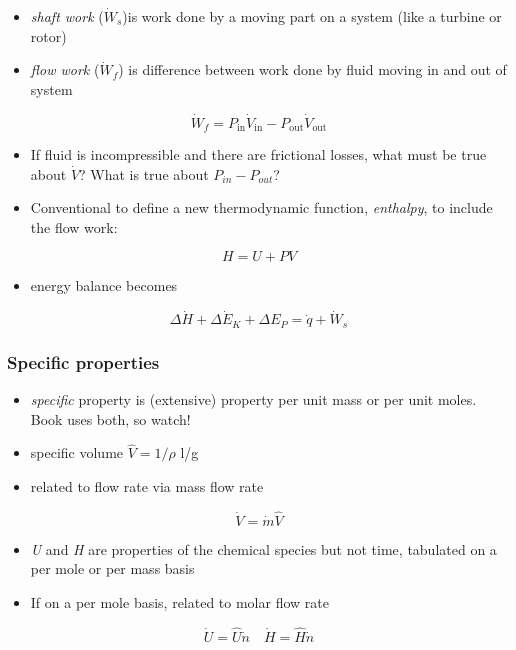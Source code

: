 \documentclass[11pt]{article}
\begin{document}
\begin{itemize}
\item \emph{shaft work} (\(\dot{W}_{s}\))is work done by a moving part on a system (like a turbine or rotor)
\item \emph{flow work} (\(\dot{W}_{f}\)) is difference between work done by fluid moving in and out of system
\end{itemize}

\[ \dot{W}_{f} = P_{\text{in}}\dot{V}_{\text{in}}-P_{\text{out}}\dot{V}_{\text{out}} \]

\begin{itemize}
\item If fluid is incompressible and there are frictional losses, what must be true about \( \dot{V}\)?  What is true about \( P_{in} - P_{out}\)?

\item Conventional to define a new thermodynamic function, \emph{enthalpy}, to include the flow work:
\end{itemize}

\[ H = U + PV \]

\begin{itemize}
\item energy balance becomes
\end{itemize}

\[ \Delta\dot{H} + \Delta\dot{E}_{K} + \Delta{E}_{P} = \dot{q} + \dot{W}_{s} \]

\subsubsection{Specific properties}
\label{sec-9-3-2}
\begin{itemize}
\item \emph{specific} property is (extensive) property per unit mass or per unit moles. Book uses both, so watch!

\item specific volume \(\hat{V} = 1/\rho \)  l/g

\item related to flow rate via mass flow rate
\end{itemize}
\[ \dot{V} = \dot{m}\hat{V} \]

\begin{itemize}
\item \emph{U} and \emph{H} are properties of the chemical species but not time, tabulated on a per mole or per mass basis
\item If on a per mole basis, related to molar flow rate
\end{itemize}
\[\dot{U} = \hat{U}\dot{n}\quad \dot{H} = \hat{H}\dot{n}  \]
\end{document}
